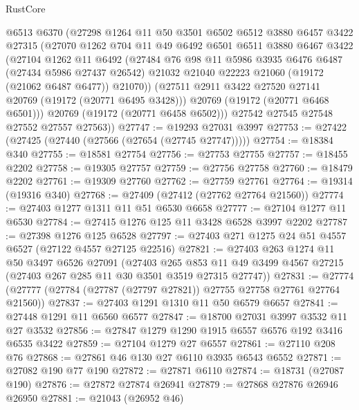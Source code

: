 \begin{lexlean}{RustCore}
\begin{coremodule}
        @6513
        @6370
        (@27298
          @1264
          @11
          @50
          @3501
          @6502
          @6512
          @3880
          @6457
          @3422
          @27315
          (@27070
            @1262
            @704
            @11
            @49
            @6492
            @6501
            @6511
            @3880
            @6467
            @3422
            (@27104
              @1262
              @11
              @6492
              (@27484
                @76
                @98
                @11
                @5986
                @3935
                @6476
                @6487
                (@27434 @5986 @27437 @26542)
                @21032
                @21040
                @22223
                @21060
                (@19172 (@21062 @6487 @6477))
                @21070))
            (@27511 @2911 @3422 @27520 @27141 @20769 (@19172 (@20771 @6495 @3428)))
            @20769
            (@19172 (@20771 @6468 @6501)))
          @20769
          (@19172 (@20771 @6458 @6502)))
        @27542
        @27545
        @27548
        @27552
        @27557
        @27563))
@27747 := @19293 @27031 @3997
@27753 := @27422 (@27425 (@27440 (@27566 (@27654 (@27745 @27747)))))
@27754 := @18384 @340
@27755 := @18581 @27754
@27756 := @27753 @27755
@27757 := @18455 @2202
@27758 := @19305 @27757
@27759 := @27756 @27758
@27760 := @18479 @2202
@27761 := @19309 @27760
@27762 := @27759 @27761
@27764 := @19314 (@19316 @340)
@27768 := @27409 (@27412 (@27762 @27764 @21560))
@27774 := @27403 @1277 @1311 @11 @51 @6530 @6658
@27777 := @27104 @1277 @11 @6530
@27784 := @27415 @1276 @125 @11 @3428 @6528 @3997 @2202
@27787 := @27398 @1276 @125 @6528
@27797 := @27403 @271 @1275 @24 @51 @4557 @6527 (@27122 @4557 @27125 @22516)
@27821 := @27403
    @263
    @1274
    @11
    @50
    @3497
    @6526
    @27091
    (@27403
      @265
      @853
      @11
      @49
      @3499
      @4567
      @27215
      (@27403 @267 @285 @11 @30 @3501 @3519 @27315 @27747))
@27831 := @27774 (@27777 (@27784 (@27787 (@27797 @27821)) @27755 @27758 @27761 @27764 @21560))
@27837 := @27403 @1291 @1310 @11 @50 @6579 @6657
@27841 := @27448 @1291 @11 @6560 @6577
@27847 := @18700 @27031 @3997 @3532 @11 @27 @3532
@27856 := @27847 @1279 @1290 @1915 @6557 @6576 @192 @3416 @6535 @3422
@27859 := @27104 @1279 @27 @6557
@27861 := @27110 @208 @76
@27868 := @27861 @46 @130 @27 @6110 @3935 @6543 @6552
@27871 := @27082 @190 @77 @190
@27872 := @27871 @6110
@27874 := @18731 (@27087 @190)
@27876 := @27872 @27874 @26941
@27879 := @27868 @27876 @26946 @26950
@27881 := @21043 (@26952 @46)

\end{coremodule}
\end{lexlean}
